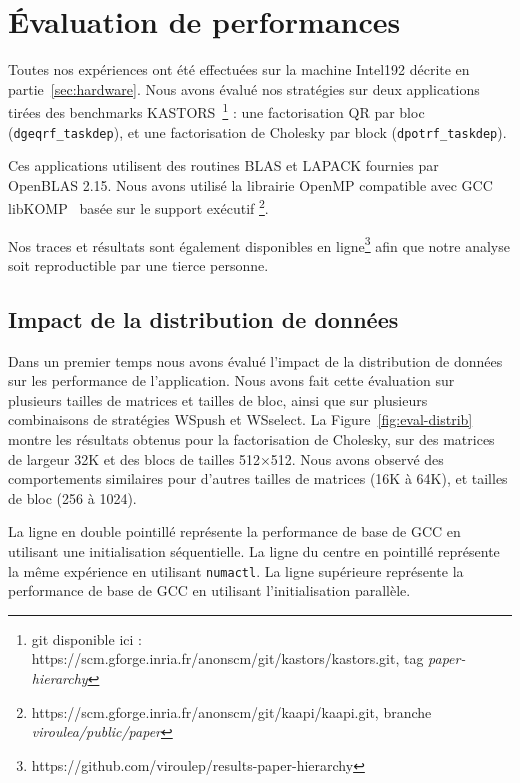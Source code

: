 \documentclass[parallelisme]{compas2016}
\begin{document}
\section{Évaluation de performances}
\label{sec:performances-evaluation}
Toutes nos expériences ont été effectuées sur la machine Intel192 décrite en partie~\ref{sec:hardware}.
Nous avons évalué nos stratégies sur deux applications tirées des benchmarks
KASTORS~\cite{virouleau:hal-01081974}\footnote{git disponible ici : https://scm.gforge.inria.fr/anonscm/git/kastors/kastors.git, tag \emph{paper-hierarchy}} :
une factorisation QR par bloc (\verb/dgeqrf_taskdep/), et une factorisation de
Cholesky par block (\verb/dpotrf_taskdep/).

Ces applications utilisent des routines BLAS et LAPACK fournies par OpenBLAS 2.15.
Nous avons utilisé la librairie OpenMP compatible avec GCC libKOMP~\cite{libkomp} basée
sur le support exécutif \kaapi\footnote{https://scm.gforge.inria.fr/anonscm/git/kaapi/kaapi.git,
branche \emph{viroulea/public/paper}}.

Nos traces et résultats sont également disponibles en ligne\footnote{https://github.com/viroulep/results-paper-hierarchy} afin que notre analyse
soit reproductible par une tierce personne.


\subsection{Impact de la distribution de données}

Dans un premier temps nous avons évalué l'impact de la distribution de données sur
les performance de l'application. Nous avons fait cette évaluation sur plusieurs
tailles de matrices et tailles de bloc, ainsi que sur plusieurs combinaisons
de stratégies WSpush et WSselect. La Figure~\ref{fig:eval-distrib} montre les
résultats obtenus pour la factorisation de Cholesky, sur des matrices de largeur
32K et des blocs de tailles 512$\times$512. Nous avons observé des comportements
similaires pour d'autres tailles de matrices (16K à 64K), et tailles de bloc (256 à 1024).

La ligne en double pointillé représente la performance de base de GCC en utilisant
une initialisation séquentielle. La ligne du centre en pointillé représente la
même expérience en utilisant \verb/numactl/. La ligne supérieure représente la
performance de base de GCC en utilisant l'initialisation parallèle.
\end{document}
